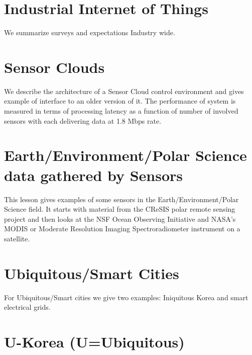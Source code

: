 \section{Industrial Internet of Things}

We summarize surveys and expectations Industry wide.



\section{Sensor Clouds}

We describe the architecture of a Sensor Cloud control environment and
gives example of interface to an older version of it. The performance of
system is measured in terms of processing latency as a function of
number of involved sensors with each delivering data at 1.8 Mbps rate.



\section{Earth/Environment/Polar Science data gathered by Sensors}

This lesson gives examples of some sensors in the
Earth/Environment/Polar Science field. It starts with material from the
CReSIS polar remote sensing project and then looks at the NSF Ocean
Observing Initiative and NASA's MODIS or Moderate Resolution Imaging
Spectroradiometer instrument on a satellite.



\section{Ubiquitous/Smart Cities}

For Ubiquitous/Smart cities we give two examples: Iniquitous Korea and
smart electrical grids.



\section{U-Korea (U=Ubiquitous)}

